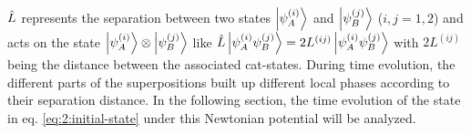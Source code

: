 $\hat{L}$ represents the separation between two states $\ket{\psi^{(i)}_A}$ and $\ket{\psi^{(j)}_B}$ ($i,j=1,2$) and acts on the state $\ket{\psi^{(i)}_A} \otimes \ket{\psi^{(j)}_B}$ like $\hat{L} \ket{\psi^{(i)}_A \psi^{(j)}_B} = 2L^{(ij)}\ket{\psi^{(i)}_A \psi^{(j)}_B}$ with $2L^{(ij)}$ being the distance between the associated cat-states.
During time evolution, the different parts of the superpositions built up different local phases according to their separation distance.  In the following section, the time evolution of the state in eq. \eqref{eq:2:initial-state} under this Newtonian potential will be analyzed.







